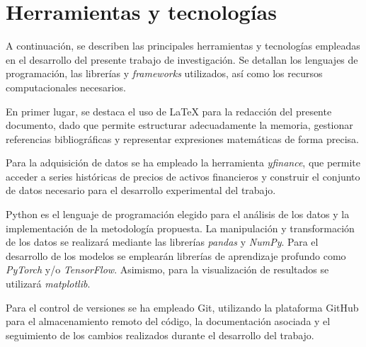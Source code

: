 \clearpage
\chapter{Herramientas y tecnologías}

A continuación, se describen las principales herramientas y tecnologías empleadas en el desarrollo del presente trabajo de investigación. Se detallan los lenguajes de programación, las librerías y \textit{frameworks} utilizados, así como los recursos computacionales necesarios.

En primer lugar, se destaca el uso de LaTeX para la redacción del presente documento, dado que permite estructurar adecuadamente la memoria, gestionar referencias bibliográficas y representar expresiones matemáticas de forma precisa.

Para la adquisición de datos se ha empleado la herramienta \textit{yfinance}, que permite acceder a series históricas de precios de activos financieros y construir el conjunto de datos necesario para el desarrollo experimental del trabajo.

Python es el lenguaje de programación elegido para el análisis de los datos y la implementación de la metodología propuesta. La manipulación y transformación de los datos se realizará mediante las librerías \textit{pandas} y \textit{NumPy}. Para el desarrollo de los modelos se emplearán librerías de aprendizaje profundo como \textit{PyTorch} y/o \textit{TensorFlow}. Asimismo, para la visualización de resultados se utilizará \textit{matplotlib}.

Para el control de versiones se ha empleado Git, utilizando la plataforma GitHub para el almacenamiento remoto del código, la documentación asociada y el seguimiento de los cambios realizados durante el desarrollo del trabajo.
